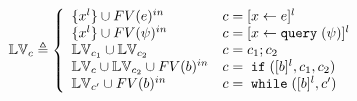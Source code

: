\begin{defn}
\label{def:lvar}
$$
  \lvar_{c} \triangleq
  \left\{
  \begin{array}{ll}
      \{{x}^l\} \cup FV(\expr)^{in}                  
      & {c} = [{\assign x e}]^{l} 
      \\
      \{{x}^l\}   \cup FV(\qexpr)^{in}                
      & {c} = [{\assign x \query(\qexpr)}]^{l} 
      \\
      \lvar_{{c_1}} \cup \lvar_{{c_2}}  
      & {c} = {c_1};{c_2}
      \\
      \lvar_{{c}} \cup \lvar_{{c_2}} \cup FV(\bexpr)^{in}
      & {c} =\eif([\bexpr]^{l}, c_1, c_2) 
      \\
      \lvar_{{c}'} \cup FV(\bexpr)^{in}
      & {c}   = \ewhile ([\bexpr]^{l}, {c}')
\end{array}
\right.
$$
\end{defn}
%
%
%

